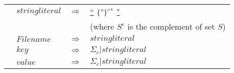 \documentclass[a4paper,11pt]{article}
\theoremstyle{definition}
\begin{document}
\begin{tabularx}{\textwidth}{p{0in}llX}
					&	$\mathit{stringliteral}$								&	$\Rightarrow$	&	\underline{``} ${{\{"\}}^c}^{*}$ \underline{"} \\
					&															&					&	(where $S^c$ is the complement of set $S$)\\
					&	$\mathit{Filename}$										&	$\Rightarrow$	&	$\mathit{stringliteral}$ \\
					&	$\mathit{key}$											&	$\Rightarrow$	&	$\Sigma_{c} | \mathit{stringliteral}$ \\
					&	$\mathit{value}$										&	$\Rightarrow$	&	$\Sigma_{c} | \mathit{stringliteral}$ \\
					\hline
				\end{tabularx}

	
	
\end{document}
